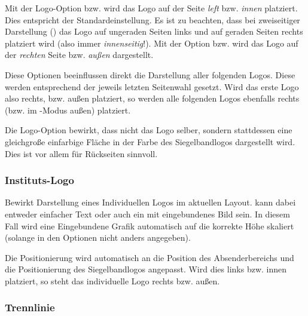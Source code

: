 Mit der Logo-Option  bzw.  wird das Logo auf der Seite
\emph{left} bzw. \emph{innen} platziert. Dies entspricht der Standardeinstellung.
Es ist zu beachten, dass bei zweiseitiger Darstellung ()
das Logo auf ungeraden Seiten links und auf geraden Seiten rechts platziert wird
(also immer \emph{innenseitig}!).
Mit der Option  bzw.  wird das Logo auf der \emph{rechten}
Seite bzw. \emph{außen} dargestellt.

\begin{important}
Diese Optionen beeinflussen direkt die Darstellung aller folgenden Logos.
Diese werden entsprechend der jeweils letzten Seitenwahl gesetzt.
Wird das erste Logo also rechts, bzw. außen platziert, so werden alle folgenden
Logos ebenfalls rechts (bzw. im -Modus außen) platziert.
\end{important}

\begin{Declaration}
\end{Declaration}

Die Logo-Option  bewirkt, dass nicht das Logo selber,
sondern stattdessen eine gleichgroße einfarbige Fläche in der Farbe
des Siegelbandlogos dargestellt wird.
Dies ist vor allem für Rückseiten sinnvoll.


\subsubsection{Instituts-Logo}

\vspace*{-5mm}
\begin{Declaration}
\end{Declaration}

Bewirkt Darstellung eines Individuellen Logos im aktuellen Layout.
 kann dabei entweder einfacher Text oder auch ein 
mit  eingebundenes Bild sein.
In diesem Fall wird eine Eingebundene Grafik automatisch auf die korrekte
Höhe skaliert (solange in den Optionen nicht anders angegeben).

Die Positionierung wird automatisch an die Position des Absenderbereichs und
die Positionierung des Siegelbandlogos angepasst.
Wird dies links bzw. innen platziert, so steht das individuelle
Logo rechts bzw. außen.

\subsubsection{Trennlinie}

